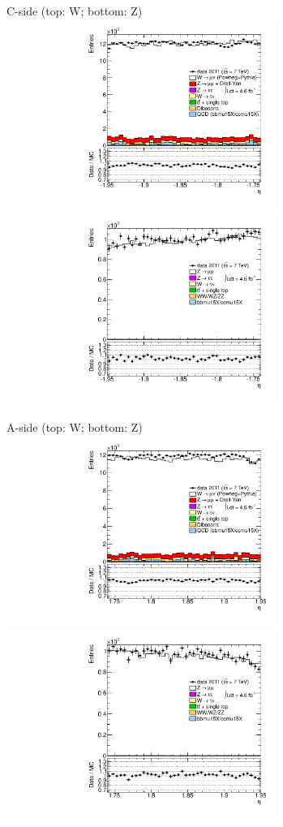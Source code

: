 {

\colb[T]

C-side (top: W; bottom: Z)
\centering
\includegraphics[width=0.66\textwidth]{dates/20130306/figures/etaphi/W_9_C_stack_l_eta_POS} \\
\includegraphics[width=0.66\textwidth]{dates/20130306/figures/etaphi/Z_9_C_stack_lP_eta_ALL.pdf}

A-side (top: W; bottom: Z)
\centering
\includegraphics[width=0.66\textwidth]{dates/20130306/figures/etaphi/W_9_A_stack_l_eta_POS} \\
\includegraphics[width=0.66\textwidth]{dates/20130306/figures/etaphi/Z_9_A_stack_lP_eta_ALL.pdf} 

\cole
}


